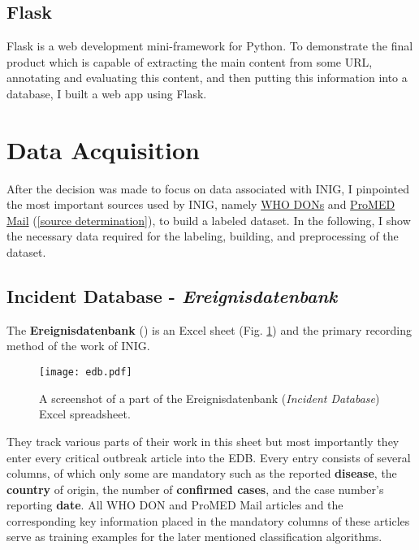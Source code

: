 
\subsection{Flask}
  Flask is a web development mini-framework for Python.
  To demonstrate the final product which is capable of extracting the main content from some URL, annotating and evaluating this content, and then putting this information into a database, I built a web app using Flask.

\section{Data Acquisition}
  After the decision was made to focus on data associated with INIG, I pinpointed the most important sources used by INIG, namely \href{https://www.who.int/csr/don/en/}{WHO DONs} and \href{https://www.promedmail.org}{ProMED Mail} (\ref{source determination}), to build a labeled dataset.
  In the following, I show the necessary data required for the labeling, building, and preprocessing of the dataset.

\subsection{Incident Database - \textit{Ereignisdatenbank}}
  The \textbf{Ereignisdatenbank} () is an Excel sheet (Fig. \ref{fig:edb_pic}) and the primary recording method of the work of INIG.
  \begin{figure}[h!]
    \centering
    \texttt{[image: edb.pdf]}
    \caption{A screenshot of a part of the Ereignisdatenbank (\textit{Incident Database}) Excel spreadsheet.}
  \label{fig:edb_pic}
  \end{figure}
  They track various parts of their work in this sheet but most importantly they enter every critical outbreak article into the EDB.
  Every entry consists of several columns, of which only some are mandatory such as the reported \textbf{disease}, the \textbf{country} of origin, the number of \textbf{confirmed cases}, and the case number's reporting \textbf{date}.
  All WHO DON and ProMED Mail articles and the corresponding key information placed in the mandatory columns of these articles serve as training examples for the later mentioned classification algorithms.

